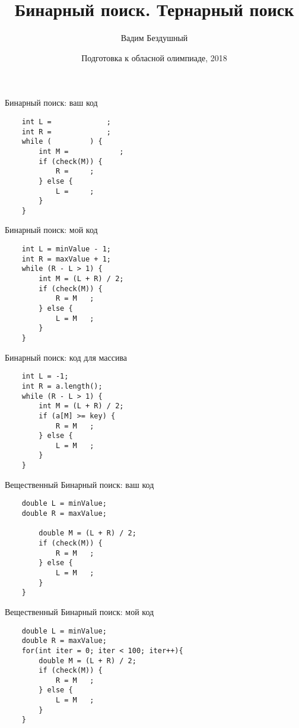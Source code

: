 \documentclass{beamer}
\title{Бинарный поиск. Тернарный поиск}
\author{Вадим Бездушный}
\date{Подготовка к обласной олимпиаде, 2018}
\begin{document}
\begin{frame}
  \titlepage
\end{frame}



\begin{frame}[fragile]{Бинарный поиск: ваш код}
    \begin{verbatim}
    int L =             ;
    int R =             ;
    while (         ) {
        int M =            ;
        if (check(M)) {
            R =     ;
        } else {
            L =     ;
        }
    }
    \end{verbatim}
\end{frame}

\begin{frame}[fragile]{Бинарный поиск: мой код}
    \begin{verbatim}
    int L = minValue - 1;
    int R = maxValue + 1;
    while (R - L > 1) {
        int M = (L + R) / 2;
        if (check(M)) {
            R = M   ;
        } else {
            L = M   ;
        }
    }
    \end{verbatim}
\end{frame}

\begin{frame}[fragile]{Бинарный поиск: код для массива}
    \begin{verbatim}
    int L = -1;
    int R = a.length();
    while (R - L > 1) {
        int M = (L + R) / 2;
        if (a[M] >= key) {
            R = M   ;
        } else {
            L = M   ;
        }
    }
    \end{verbatim}
\end{frame}


\begin{frame}[fragile]{Вещественный Бинарный поиск: ваш код}
    \begin{verbatim}
    double L = minValue;
    double R = maxValue;
    
        double M = (L + R) / 2;
        if (check(M)) {
            R = M   ;
        } else {
            L = M   ;
        }
    }
    \end{verbatim}
\end{frame}

\begin{frame}[fragile]{Вещественный Бинарный поиск: мой код}
    \begin{verbatim}
    double L = minValue;
    double R = maxValue;
    for(int iter = 0; iter < 100; iter++){
        double M = (L + R) / 2;
        if (check(M)) {
            R = M   ;
        } else {
            L = M   ;
        }
    }
    \end{verbatim}
\end{frame}
\end{document}
